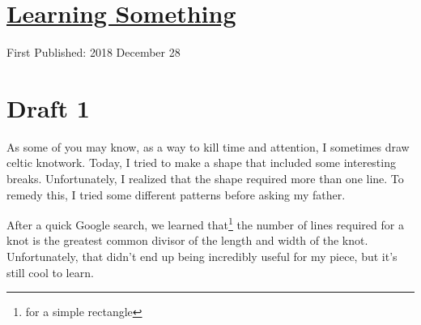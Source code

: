 \documentclass[12pt]{article}[titlepage]
\newcommand{\1}{\={a}}
\newcommand{\2}{\={e}}
\newcommand{\3}{\={\i}}
\newcommand{\4}{\=o}
\newcommand{\5}{\=u}
\newcommand{\6}{\={A}}
\renewcommand{\,}{\textsuperscript{,}}
\begin{document}
\doublespacing
\section{\href{learning-something.html}{Learning Something}}
First Published: 2018 December 28
\section{Draft 1}
As some of you may know, as a way to kill time and attention, I sometimes draw celtic knotwork.
Today, I tried to make a shape that included some interesting breaks.
Unfortunately, I realized that the shape required more than one line.
To remedy this, I tried some different patterns before asking my father.

After a quick Google search, we learned that\footnote{for a simple rectangle} the number of lines required for a knot is the greatest common divisor of the length and width of the knot.
Unfortunately, that didn't end up being incredibly useful for my piece, but it's still cool to learn.
\end{document}
